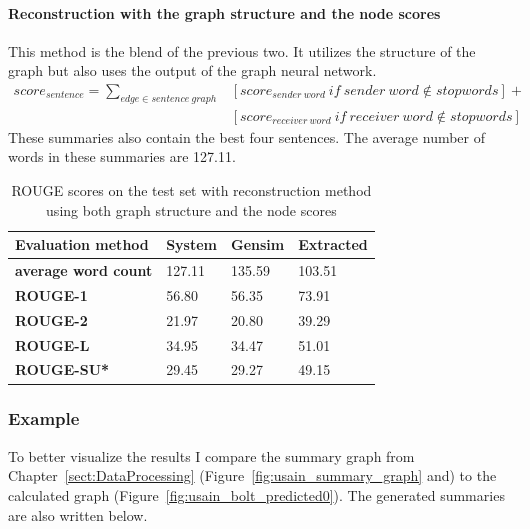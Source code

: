 \paragraph{Reconstruction with the graph structure and the node scores}

This method is the blend of the previous two. It utilizes the structure of the graph but also uses the output of the graph neural network.
\begin{eqnarray*}
	score_{sentence} = \sum_{edge \in sentence\ graph} &[score_{sender\ word}\ if\ sender\ word \notin stopwords] + \\&[score_{receiver\ word}\ if\ receiver\ word \notin stopwords]
\end{eqnarray*}
These summaries also contain the best four sentences. The average number of words in these summaries are 127.11.
\begin{table}[!ht]
	\centering
	\begin{tabular}{| l | l | l | l |}
		\hline
		\textbf{Evaluation method}&\textbf{System}&\textbf{Gensim}&\textbf{Extracted}\\ \hline \hline
		\textbf{average word count}&127.11&135.59&103.51 \\ \hline
		\textbf{ROUGE-1}&56.80&56.35&73.91 \\ \hline
		\textbf{ROUGE-2}&21.97&20.80&39.29 \\ \hline
		\textbf{ROUGE-L}&34.95&34.47&51.01 \\ \hline
		\textbf{ROUGE-SU*}&29.45&29.27&49.15 \\ \hline
	\end{tabular}
\caption{ROUGE scores on the test set with reconstruction method using both graph structure and the node scores}
\end{table}

\subsubsection{Example}
To better visualize the results I compare the summary graph from Chapter~\ref{sect:DataProcessing} (Figure~\ref{fig:usain_summary_graph} and) to the calculated graph (Figure~\ref{fig:usain_bolt_predicted0}). The generated summaries are also written below.

